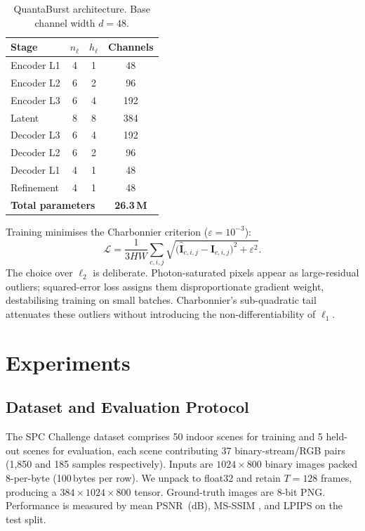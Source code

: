 \documentclass[10pt,twocolumn,letterpaper]{article}
\newcommand{\Xhat}{\hat{\mathbf{I}}}
\newcommand{\Igt}{\mathbf{I}}
\newcommand{\calL}{\mathcal{L}}
\begin{document}
\begin{table}[t]
  \centering
  \small
  \caption{QuantaBurst architecture.  Base channel width $d{=}48$.}
  \label{tab:arch}
  \setlength{\tabcolsep}{4pt}
  \begin{tabular}{lccc}
    \toprule
    \textbf{Stage} & $n_\ell$ & $h_\ell$ & \textbf{Channels} \\
    \midrule
    Encoder L1  & 4 & 1 & 48  \\
    Encoder L2  & 6 & 2 & 96  \\
    Encoder L3  & 6 & 4 & 192 \\
    Latent      & 8 & 8 & 384 \\
    Decoder L3  & 6 & 4 & 192 \\
    Decoder L2  & 6 & 2 & 96  \\
    Decoder L1  & 4 & 1 & 48  \\
    Refinement  & 4 & 1 & 48  \\
    \midrule
    \multicolumn{3}{l}{\textbf{Total parameters}} & \textbf{26.3\,M} \\
    \bottomrule
  \end{tabular}
\end{table}

Training minimises the Charbonnier criterion
($\varepsilon{=}10^{-3}$):
\begin{equation}
  \calL = \frac{1}{3HW}\sum_{c,i,j}
    \sqrt{\bigl(\Xhat_{c,i,j} - \Igt_{c,i,j}\bigr)^2 + \varepsilon^2}.
  \label{eq:charb}
\end{equation}
The choice over $\ell_2$ is deliberate.  Photon-saturated pixels
appear as large-residual outliers; squared-error loss assigns them
disproportionate gradient weight, destabilising training on small
batches.  Charbonnier's sub-quadratic tail attenuates these
outliers without introducing the non-differentiability of
$\ell_1$.

\section{Experiments}
\label{sec:experiments}

\subsection{Dataset and Evaluation Protocol}

The SPC Challenge dataset comprises 50 indoor scenes for training
and 5 held-out scenes for evaluation, each scene contributing
37 binary-stream/RGB pairs (1,850 and 185 samples respectively).
Inputs are $1024{\times}800$ binary images packed 8-per-byte
(100\,bytes per row).  We unpack to float32 and retain $T{=}128$
frames, producing a $384{\times}1024{\times}800$ tensor.
Ground-truth images are 8-bit PNG.
Performance is measured by mean PSNR~(dB), MS-SSIM
\cite{wang2004image}, and LPIPS \cite{zhang2018unreasonable} on
the test split.
\end{document}
